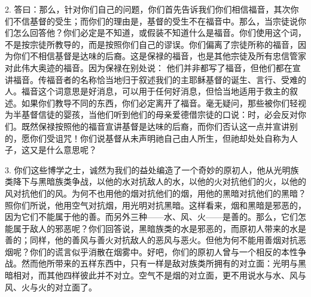 2. 答曰：那么，针对你们自己的问题，你们首先告诉我们你们相信福音，其次你们不信基督的受生；而你们的理由是，基督的受生不在福音中。那么，当宗徒说你们怎么回答他？你们必定是不知道，或假装不知道什么是福音。你们使用这个词，不是按宗徒所教导的，而是按照你们自己的谬误。你们偏离了宗徒所称的福音，因为你们不相信基督是达味的后裔。这是保禄的福音，也是其他宗徒及所有忠信管家对此伟大奥迹的福音。因为保禄在别处说： 他们并非都写了福音，但他们都在宣讲福音。传福音者的名称恰当地归于叙述我们的主耶稣基督的诞生、言行、受难的人。福音这个词意思是好消息，可以用于任何好消息，但恰当地适用于救主的叙述。如果你们教导不同的东西，你们必定离开了福音。毫无疑问，那些被你们轻视为半基督信徒的婴孩，当他们听到他们的母亲爱德借宗徒的口说：时，必会反对你们。既然保禄按照他的福音宣讲基督是达味的后裔，而你们否认这一点并宣讲别的，愿你们受诅咒！你们说基督从未声明祂自己由人所生，但祂却处处自称为人子，这又是什么意思呢？\par

3. 你们这些博学之士，诚然为我们的益处编造了一个奇妙的原初人，他从光明族类降下与黑暗族类争战，以他的水对抗敌人的水，以他的火对抗他们的火，以他的风对抗他们的风。为何不也用他的烟对抗他们的烟，用他的黑暗对抗他们的黑暗？照你们所说，他用空气对抗烟，用光明对抗黑暗。这样看来，烟和黑暗是邪恶的，因为它们不能属于他的善。而另外三种——水、风、火——是善的。那么，它们怎能属于敌人的邪恶呢？你们回答说，黑暗族类的水是邪恶的，而原初人带来的水是善的；同样，他的善风与善火对抗敌人的恶风与恶火。但他为何不能用善烟对抗恶烟呢？你们的谎言似乎消散在烟雾中。好吧，你们的原初人曾与一个相反的本性争战。然而他所带来的五样东西中，只有一样是敌对族类所拥有的对立面：光明与黑暗相对，而其他四样彼此并不对立。空气不是烟的对立面，更不用说水与水、风与风、火与火的对立面了。\par

